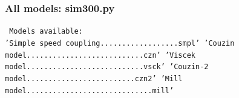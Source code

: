 \documentclass[compress]{beamer}
\begin{document}
\begin{frame}
  \frametitle{All models: sim300.py}
  
  
  \texttt{
  Models available:\\
  'Simple speed coupling..................smpl'
  'Couzin model...........................czn'
  'Viscek model...........................vsck'
  'Couzin-2 model.........................czn2'
  'Mill model.............................mill'
}
  
   
%
%
%
%
\end{frame}
\end{document}

